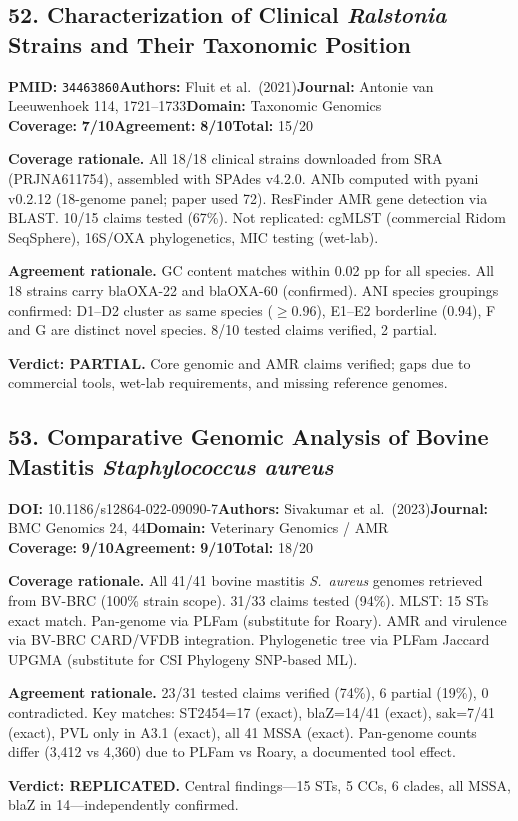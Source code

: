 \documentclass[11pt]{article}
\newcommand{\scorebadge}[2]{\textbf{#1:} \textbf{#2/10}}
\begin{document}
\subsection{52. Characterization of Clinical \textit{Ralstonia} Strains and Their Taxonomic Position}
\textbf{PMID:} \texttt{34463860}\quad\textbf{Authors:} Fluit et al.\ (2021)\quad\textbf{Journal:} Antonie van Leeuwenhoek 114, 1721--1733\quad\textbf{Domain:} Taxonomic Genomics\\
\scorebadge{Coverage}{7}\quad\scorebadge{Agreement}{8}\quad\textbf{Total:} 15/20\par\smallskip
\noindent\textbf{Coverage rationale.} All 18/18 clinical strains downloaded from SRA (PRJNA611754), assembled with SPAdes v4.2.0. ANIb computed with pyani v0.2.12 (18-genome panel; paper used 72). ResFinder AMR gene detection via BLAST. 10/15 claims tested (67\%). Not replicated: cgMLST (commercial Ridom SeqSphere), 16S/OXA phylogenetics, MIC testing (wet-lab).\par
\noindent\textbf{Agreement rationale.} GC content matches within 0.02 pp for all species. All 18 strains carry blaOXA-22 and blaOXA-60 (confirmed). ANI species groupings confirmed: D1--D2 cluster as same species ($\geq$0.96), E1--E2 borderline (0.94), F and G are distinct novel species. 8/10 tested claims verified, 2 partial.\par\smallskip
\noindent\textbf{Verdict: PARTIAL.} Core genomic and AMR claims verified; gaps due to commercial tools, wet-lab requirements, and missing reference genomes.

\subsection{53. Comparative Genomic Analysis of Bovine Mastitis \textit{Staphylococcus aureus}}
\textbf{DOI:} 10.1186/s12864-022-09090-7\quad\textbf{Authors:} Sivakumar et al.\ (2023)\quad\textbf{Journal:} BMC Genomics 24, 44\quad\textbf{Domain:} Veterinary Genomics / AMR\\
\scorebadge{Coverage}{9}\quad\scorebadge{Agreement}{9}\quad\textbf{Total:} 18/20\par\smallskip
\noindent\textbf{Coverage rationale.} All 41/41 bovine mastitis \textit{S.\ aureus} genomes retrieved from BV-BRC (100\% strain scope). 31/33 claims tested (94\%). MLST: 15 STs exact match. Pan-genome via PLFam (substitute for Roary). AMR and virulence via BV-BRC CARD/VFDB integration. Phylogenetic tree via PLFam Jaccard UPGMA (substitute for CSI Phylogeny SNP-based ML).\par
\noindent\textbf{Agreement rationale.} 23/31 tested claims verified (74\%), 6 partial (19\%), 0 contradicted. Key matches: ST2454=17 (exact), blaZ=14/41 (exact), sak=7/41 (exact), PVL only in A3.1 (exact), all 41 MSSA (exact). Pan-genome counts differ (3,412 vs 4,360) due to PLFam vs Roary, a documented tool effect.\par\smallskip
\noindent\textbf{Verdict: REPLICATED.} Central findings---15 STs, 5 CCs, 6 clades, all MSSA, blaZ in 14---independently confirmed.
\end{document}
